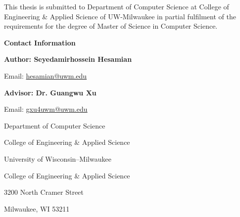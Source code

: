 \begin{large}

    \begin{center}
        \begin{flushleft}
            This thesis is submitted to Department of Computer Science at College of Engineering \& Applied Science of UW-Milwaukee in partial fulfilment of the requirements for the degree of
            Master of Science in Computer Science.
        \end{flushleft}
    \end{center}

    \vfill
    \vspace*{5cm}
    
    {\Large\textbf{Contact Information}}
    
    \vspace*{0.5cm}
    
    \textbf{Author: Seyedamirhossein Hesamian}
    
    Email: \href{mailto:hesamian@uwm.edu}{hesamian@uwm.edu}
    
    \vspace*{1cm}
    
    \textbf{Advisor: Dr. Guangwu Xu}
    
    Email: \href{mailto:gxu4uwm@uwm.edu}{gxu4uwm@uwm.edu}
    
    \vspace*{2cm}
    
    Department of Computer Science

    College of Engineering \& Applied Science
    
    University of Wisconsin–Milwaukee
    
    College of Engineering \& Applied Science
    
    \vspace*{0.5cm}
    
    3200 North Cramer Street
    
    Milwaukee, WI 53211

\end{large}
\thispagestyle{empty}

\newpage
